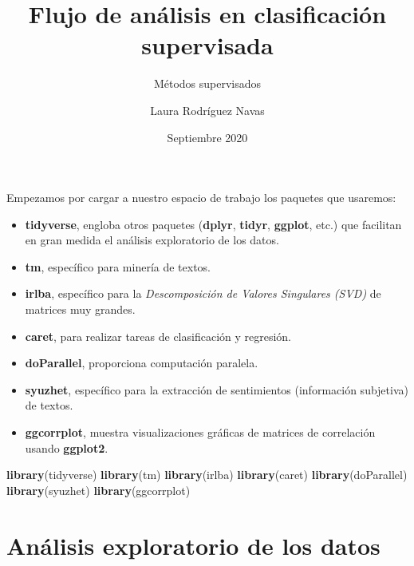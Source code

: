 \documentclass[]{article}
\title{Flujo de análisis en clasificación supervisada}
\subtitle{Métodos supervisados}
\author{Laura Rodríguez Navas}
\date{Septiembre 2020}
\newenvironment{Shaded}{\begin{snugshade}}{\end{snugshade}}
\newcommand{\KeywordTok}[1]{\textcolor[rgb]{0.13,0.29,0.53}{\textbf{#1}}}
\newcommand{\NormalTok}[1]{#1}
\providecommand{\tightlist}{%
  \setlength{\itemsep}{0pt}\setlength{\parskip}{0pt}}
\begin{document}
\maketitle

{
\setcounter{tocdepth}{3}
\renewcommand{\contentsname}{Contenido}
\tableofcontents
}
\newpage

Empezamos por cargar a nuestro espacio de trabajo los paquetes que
usaremos:

\begin{itemize}
\tightlist
\item
  \textbf{tidyverse}, engloba otros paquetes (\textbf{dplyr},
  \textbf{tidyr}, \textbf{ggplot}, etc.) que facilitan en gran medida el
  análisis exploratorio de los datos.
\item
  \textbf{tm}, específico para minería de textos.
\item
  \textbf{irlba}, específico para la \emph{Descomposición de Valores
  Singulares (SVD)} de matrices muy grandes.
\item
  \textbf{caret}, para realizar tareas de clasificación y regresión.
\item
  \textbf{doParallel}, proporciona computación paralela.
\item
  \textbf{syuzhet}, específico para la extracción de sentimientos (información subjetiva) de
  textos.
\item
  \textbf{ggcorrplot}, muestra visualizaciones gráficas de matrices de
  correlación usando \textbf{ggplot2}.
\end{itemize}

\vspace{3mm}

\begin{Shaded}
\begin{Highlighting}[]
\KeywordTok{library}\NormalTok{(tidyverse)}
\KeywordTok{library}\NormalTok{(tm)}
\KeywordTok{library}\NormalTok{(irlba)}
\KeywordTok{library}\NormalTok{(caret)}
\KeywordTok{library}\NormalTok{(doParallel)}
\KeywordTok{library}\NormalTok{(syuzhet)}
\KeywordTok{library}\NormalTok{(ggcorrplot)}
\end{Highlighting}
\end{Shaded}

\hypertarget{anuxe1lisis-exploratorio-de-los-datos}{%
\section{Análisis exploratorio de los
datos}\label{anuxe1lisis-exploratorio-de-los-datos}}
\end{document}
